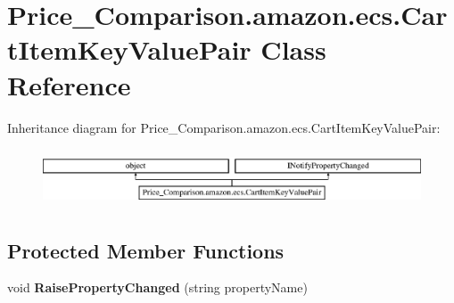 \hypertarget{class_price___comparison_1_1amazon_1_1ecs_1_1_cart_item_key_value_pair}{\section{Price\-\_\-\-Comparison.\-amazon.\-ecs.\-Cart\-Item\-Key\-Value\-Pair Class Reference}
\label{class_price___comparison_1_1amazon_1_1ecs_1_1_cart_item_key_value_pair}
}


 


Inheritance diagram for Price\-\_\-\-Comparison.\-amazon.\-ecs.\-Cart\-Item\-Key\-Value\-Pair\-:\begin{figure}[H]
\begin{center}
\leavevmode
\includegraphics[height=1.733746cm]{class_price___comparison_1_1amazon_1_1ecs_1_1_cart_item_key_value_pair}
\end{center}
\end{figure}
\subsection*{Protected Member Functions}
\begin{DoxyCompactItemize}
\item 
\hypertarget{class_price___comparison_1_1amazon_1_1ecs_1_1_cart_item_key_value_pair_a3293b4acd2d40a17043f5a6e7883adbd}{void {\bfseries Raise\-Property\-Changed} (string property\-Name)}\label{class_price___comparison_1_1amazon_1_1ecs_1_1_cart_item_key_value_pair_a3293b4acd2d40a17043f5a6e7883adbd}

\end{DoxyCompactItemize}
